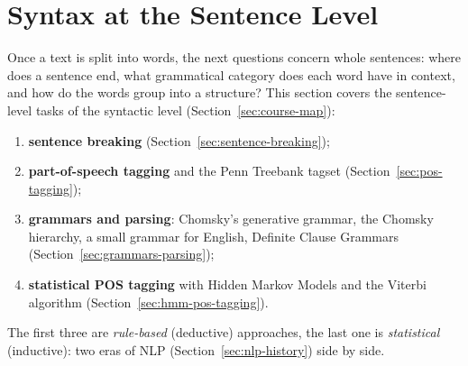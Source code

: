 \section{Syntax at the Sentence Level}
\label{sec:sentence-level-syntax}

Once a text is split into words, the next questions concern whole sentences: where does a
sentence end, what grammatical category does each word have in context, and how do the
words group into a structure? This section covers the sentence-level tasks of the
syntactic level (Section~\ref{sec:course-map}):
\begin{enumerate}[nosep]
  \item \textbf{sentence breaking} (Section~\ref{sec:sentence-breaking});
  \item \textbf{part-of-speech tagging} and the Penn Treebank tagset
        (Section~\ref{sec:pos-tagging});
  \item \textbf{grammars and parsing}: Chomsky's generative grammar, the Chomsky
        hierarchy, a small grammar for English, Definite Clause Grammars
        (Section~\ref{sec:grammars-parsing});
  \item \textbf{statistical POS tagging} with Hidden Markov Models and the Viterbi
        algorithm (Section~\ref{sec:hmm-pos-tagging}).
\end{enumerate}
The first three are \emph{rule-based} (deductive) approaches, the last one is
\emph{statistical} (inductive): two eras of NLP (Section~\ref{sec:nlp-history}) side by
side.





